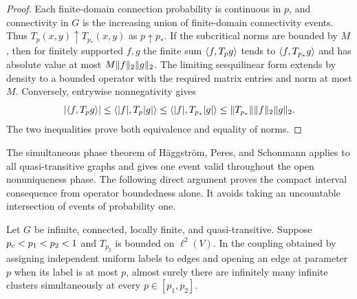 \begin{proof}
Each finite-domain connection probability is continuous in $p$, and
connectivity in $G$ is the increasing union of finite-domain
connectivity events. Thus $T_p(x,y)\uparrow T_{p_*}(x,y)$ as
$p\uparrow p_*$. If the subcritical norms are bounded by $M$, then
for finitely supported $f,g$ the finite sum
$\langle f,T_pg\rangle$ tends to $\langle f,T_{p_*}g\rangle$ and has absolute value at
most $M\lVert f\rVert_2\lVert g\rVert_2$. The limiting sesquilinear form extends
by density to a bounded operator with the required matrix entries
and norm at most $M$. Conversely, entrywise nonnegativity gives
\[
 |\langle f,T_pg\rangle|\le\langle|f|,T_p|g|\rangle
 \le\langle|f|,T_{p_*}|g|\rangle
 \le\lVert T_{p_*}\rVert\lVert f\rVert_2\lVert g\rVert_2.
\]
The two inequalities prove both equivalence and equality of norms.
\end{proof}

The simultaneous phase theorem of H\"aggstr\"om, Peres, and Schonmann
\cite[Theorem~1.3]{HaggstromPeresSchonmann1999} applies to all
quasi-transitive graphs and gives one event valid throughout the open
nonuniqueness phase. The following direct argument proves the compact
interval consequence from operator boundedness alone. It avoids taking
an uncountable intersection of events of probability one.

\begin{proposition}
\label{con:coupled-interval}
Let $G$ be infinite, connected, locally finite, and quasi-transitive.
Suppose ${p_c}<p_1<p_2<1$ and $T_{p_2}$ is bounded on $\ell^2(V)$.
In the coupling obtained by assigning independent uniform labels to
edges and opening an edge at parameter $p$ when its label is at most
$p$, almost surely there are infinitely many infinite clusters
simultaneously at every $p\in[p_1,p_2]$.
\end{proposition}

